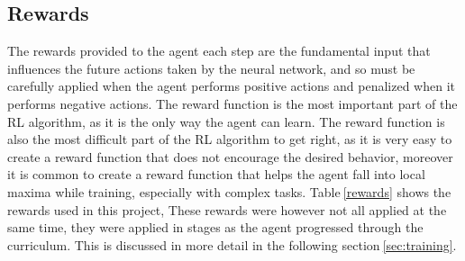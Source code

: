 \subsection{Rewards}

The rewards provided to the agent each step are the fundamental input that influences the future actions taken by the neural network, and so must be carefully applied when the agent performs positive actions and penalized when it performs negative actions. The reward function is the most important part of the RL algorithm, as it is the only way the agent can learn. The reward function is also the most difficult part of the RL algorithm to get right, as it is very easy to create a reward function that does not encourage the desired behavior, moreover it is common to create a reward function that helps the agent fall into local maxima while training, especially with complex tasks. Table$~$\ref{rewards} shows the rewards used in this project, These rewards were however not all applied at the same time, they were applied in stages as the agent progressed through the curriculum. This is discussed in more detail in the following section$~$\ref{sec:training}.


